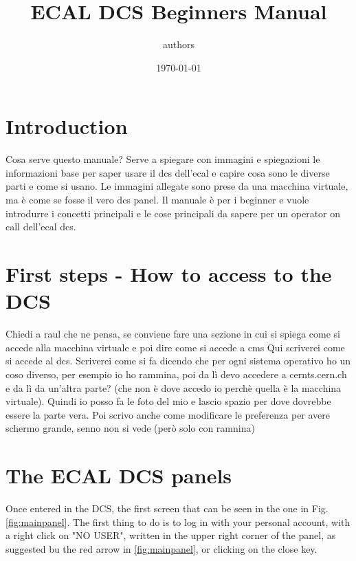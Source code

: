 \documentclass[12pt]{article}
\title{\huge ECAL DCS Beginners Manual}
\author{authors}
\date{\today}
\begin{document}
\maketitle

\newpage
\tableofcontents
\newpage


\section{Introduction}

\justifying
Cosa serve questo manuale? Serve a spiegare con immagini e spiegazioni le informazioni base per saper usare il dcs dell'ecal e capire cosa sono le diverse parti e come si usano. Le immagini allegate sono prese da una macchina virtuale, ma è come se fosse il vero dcs panel.
Il manuale è per i beginner e vuole introdurre i concetti principali e le cose principali da sapere per un operator on call dell'ecal dcs.
 
\newpage
\section{First steps - How to access to the DCS}
 Chiedi a raul che ne pensa, se conviene fare una sezione in cui si spiega come si accede alla macchina virtuale e poi dire come si accede a cms
Qui scriverei come si accede al dcs. Scriverei come si fa dicendo che per ogni sistema operativo ho un coso diverso, per esempio io ho rammina, poi da lì devo accedere a cernts.cern.ch e da lì da un'altra parte? (che non è dove accedo io perchè quella è la macchina virtuale). Quindi io posso fa le foto del mio e lascio spazio per dove dovrebbe essere la parte vera. Poi scrivo anche come modificare le preferenza per avere schermo grande, senno non si vede (però solo con ramnina)

\section{The ECAL DCS panels}
Once entered in the DCS, the first screen that can be seen in the one in Fig. \ref{fig:mainpanel}. The first thing to do is to log in with your personal account, with a right click on "NO USER", written in the upper right corner of the panel, as suggested bu the red arrow in \ref{fig:mainpanel}, or clicking on the close key.  
\end{document}
